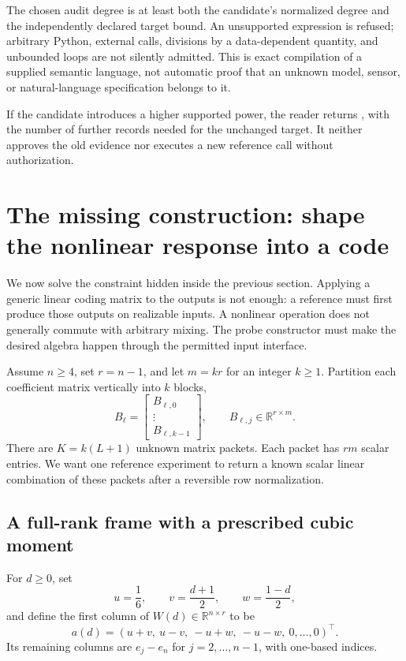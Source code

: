 \documentclass[11pt,letterpaper]{article}
\newcommand{\R}{\mathbb R}\newcommand{\V}{\mathcal V}\newcommand{\N}{\mathcal N}
\theoremstyle{remark}\newtheorem{remark}{Remark}[section]
\begin{document}
The chosen audit degree is at least both the candidate's normalized degree and the independently declared target bound. An unsupported expression is refused; arbitrary Python, external calls, divisions by a data-dependent quantity, and unbounded loops are not silently admitted. This is exact compilation of a supplied semantic language, not automatic proof that an unknown model, sensor, or natural-language specification belongs to it.

If the candidate introduces a higher supported power, the reader returns , with the number of further records needed for the unchanged target. It neither approves the old evidence nor executes a new reference call without authorization.

\section{The missing construction: shape the nonlinear response into a code}
\label{sec:construction}
We now solve the constraint hidden inside the previous section. Applying a generic linear coding matrix to the outputs is not enough: a reference must first produce those outputs on realizable inputs. A nonlinear operation does not generally commute with arbitrary mixing. The probe constructor must make the desired algebra happen through the permitted input interface.

Assume $n\ge4$, set $r=n-1$, and let $m=kr$ for an integer $k\ge1$. Partition each coefficient matrix vertically into $k$ blocks,
\begin{equation}
 B_\ell=\begin{bmatrix}B_{\ell,0}\\ \vdots\\B_{\ell,k-1}\end{bmatrix},
 \qquad B_{\ell,j}\in\R^{r\times m}.
\end{equation}
There are $K=k(L+1)$ unknown matrix packets. Each packet has $rm$ scalar entries. We want one reference experiment to return a known scalar linear combination of these packets after a reversible row normalization.

\subsection{A full-rank frame with a prescribed cubic moment}
For $d\ge0$, set
\begin{equation}
 u=\frac16,\qquad v=\frac{d+1}{2},\qquad w=\frac{1-d}{2},
\end{equation}
and define the first column of $W(d)\in\R^{n\times r}$ to be
\begin{equation}
 a(d)=(u+v,\ u-v,\ -u+w,\ -u-w,\ 0,\ldots,0)^\top.
\end{equation}
Its remaining columns are $e_j-e_n$ for $j=2,\ldots,n-1$, with one-based indices.
\end{document}
